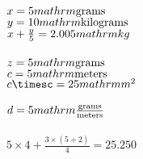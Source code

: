 \documentclass{article}
\begin{document}
$x=5\\mathrm{\mathrm{grams}}$\\
$y=10\\mathrm{\mathrm{kilograms}}$\\
$x+\frac{y}{5}=2.005\\mathrm{kg\,}$\\
\\$z=5\\mathrm{\mathrm{grams}}$\\
$c=5\\mathrm{\mathrm{meters}}$\\
$c\timesc=25\\mathrm{m^{2}\,}$\\
\\$d=5\\mathrm{\mathrm{\frac{\mathrm{grams}}{\mathrm{meters}}}}$\\
\\$5\times4+\frac{3\times(5+2)}{4}=25.250$\\
\end{document}
